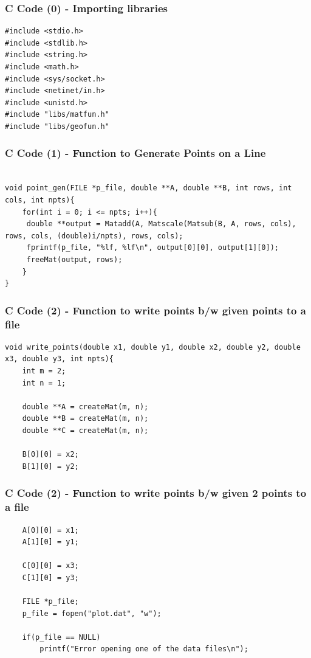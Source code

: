 \documentclass{beamer}
\begin{document}
\begin{frame}[fragile]
    \frametitle{C Code (0) - Importing libraries}

    \begin{lstlisting}
#include <stdio.h>
#include <stdlib.h>
#include <string.h>
#include <math.h>
#include <sys/socket.h>
#include <netinet/in.h>
#include <unistd.h>
#include "libs/matfun.h"
#include "libs/geofun.h"
    \end{lstlisting}
\end{frame}
\begin{frame}[fragile]
    \frametitle{C Code (1) - Function to Generate Points on a Line}

    \begin{lstlisting}

void point_gen(FILE *p_file, double **A, double **B, int rows, int cols, int npts){
    for(int i = 0; i <= npts; i++){
     double **output = Matadd(A, Matscale(Matsub(B, A, rows, cols), rows, cols, (double)i/npts), rows, cols);
     fprintf(p_file, "%lf, %lf\n", output[0][0], output[1][0]);
     freeMat(output, rows);
    }
}

    \end{lstlisting}
\end{frame}


\begin{frame}[fragile]
    \frametitle{C Code (2) - Function to write points b/w given points to a file}

    \begin{lstlisting}
void write_points(double x1, double y1, double x2, double y2, double x3, double y3, int npts){
    int m = 2;
    int n = 1;

    double **A = createMat(m, n);
    double **B = createMat(m, n);
    double **C = createMat(m, n);

    B[0][0] = x2;
    B[1][0] = y2;
    \end{lstlisting}
\end{frame}
\begin{frame}[fragile]
    \frametitle{C Code (2) - Function to write points b/w given 2 points to a file}

    \begin{lstlisting}
    A[0][0] = x1;
    A[1][0] = y1;
    
    C[0][0] = x3;
    C[1][0] = y3;
    
    FILE *p_file;
    p_file = fopen("plot.dat", "w");
    
    if(p_file == NULL)
        printf("Error opening one of the data files\n");
    \end{lstlisting}
\end{frame}
\end{document}

